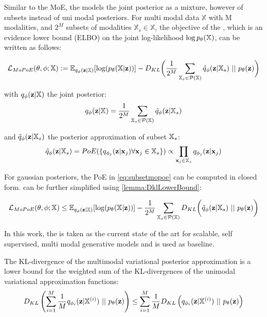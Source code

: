 Similar to the MoE, the  models the joint posterior as a mixture, however of subsets instead of uni modal posteriors.
For multi modal data $\mathbb{X}$ with M modalities, and $2^M$ subsets of modalities $\mathbb{X}_s \in \mathbb{X}$, the objective of the , which is an evidence lower bound (ELBO) on the joint log-likelihood $\log p_{\theta}(\mathbb{X})$, can be written as follows:

\begin{equation}
    \label{eq:mopoe}
    \mathcal{L}_{MoPoE}(\theta, \phi; \mathbb{X}):= \mathbb{E}_{q_{\phi}(\textbf{z}|\mathbb{X})}[\log (p_{\theta}(\mathbb{X}|\textbf{z}))] - D_{KL}\biggl( \frac{1}{2^M} \sum _{\mathbb{X}_s \in \mathcal{P}(\mathbb{X})} \tilde{q}_{\phi}(\textbf{z}|\mathbb{X}_s)\ ||\ p_{\theta}(\textbf{z})\biggr)
\end{equation}

with $q_{\phi}(\textbf{z}|\mathbb{X})$ the joint posterior:
\begin{equation}
    q_{\phi}(\textbf{z}|\mathbb{X}) = \frac{1}{2^M} \sum _{\mathbb{X}_s \in \mathcal{P}(\mathbb{X})} \tilde{q}_{\phi}(\textbf{z}|\mathbb{X}_s)
\end{equation}

and $\tilde{q}_{\phi}(\textbf{z}|\mathbb{X}_s)$ the posterior approximation of subset $\mathbb{X}_s$:
\begin{equation}
    \label{eq:subsetmopoe}
    \tilde{q}_{\phi}(\textbf{z}|\mathbb{X}_s)=PoE(\{q_{\phi_j}(\textbf{z}|\textbf{x}_j) \forall \textbf{x}_j \in \mathbb{X}_s\}) \propto \prod _{\textbf{x}_j \in \mathbb{X}_s}q_{\phi_j}(\textbf{z}|\textbf{x}_j)
\end{equation}

For gaussian posteriors, the PoE in \cref{eq:subsetmopoe} can be computed in closed form.
 can be further simplified using \cref{lemma:DklLowerBound}:

\begin{equation}
    \label{eq:mopoe_}
    \lmopoe \leq \mathbb{E}_{q_{\phi}(\textbf{z}|\mathbb{X})}[\log (p_{\theta}(\mathbb{X}|\textbf{z}))] - \frac{1}{2^M} \sum _{\mathbb{X}_s \in \mathcal{P}(\mathbb{X})} D_{KL}\biggl( \tilde{q}_{\phi}(\textbf{z}|\mathbb{X}_s)\ ||\ p_{\theta}(\textbf{z})\biggr)
\end{equation}

In this work, the  is taken as the current state of the art for scalable, self supervised, multi modal generative models and is used as baseline.


\begin{lemma}
    \label{lemma:DklLowerBound}

    The KL-divergence of the multimodal variational posterior approximation is a lower bound for the weighted sum of the KL-divergences of the unimodal variational approximation functions:
    \begin{equation}
        D_{KL} \left( \sum _{i=1} ^M \frac{1}{M}q_{\phi_i}(\textbf{z}|\mathbb{X}^{(i)})\ ||\ p_{\theta}(\textbf{z}) \right) \leq \sum _{i=1} ^M \frac{1}{M} D_{KL} \left( q_{\phi_i}(\textbf{z}|\mathbb{X}^{(i)})\ ||\ p_{\theta}(\textbf{z}) \right)
    \end{equation}
\end{lemma}


